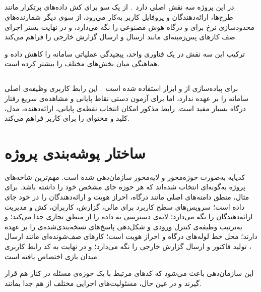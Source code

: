 \subsection{}

 در این پروژه سه نقش اصلی دارد~\cite{redis2024}. از یک سو برای
کش داده‌های پرتکرار مانند طرح‌ها، ارائه‌دهندگان و پروفایل کاربر به‌کار
می‌رود، از سوی دیگر شمارنده‌های محدودسازی نرخ برای  و درگاه هوش
مصنوعی را نگه می‌دارد، و در نهایت بستر اجرای صف کارهای پس‌زمینه‌ای مانند
ارسال  و ارسال گزارش خارجی را فراهم می‌کند.

ترکیب این سه نقش در یک فناوری واحد، پیچیدگی عملیاتی سامانه را کاهش داده
و هماهنگی میان بخش‌های مختلف را بیشتر کرده است.

\subsection{}

برای پیاده‌سازی  از  و ابزار
 استفاده شده است~\cite{vuejs2024}. این رابط کاربری وظیفه‌ی اصلی
سامانه را بر عهده ندارد، اما برای آزمون دستی نقاط پایانی و مشاهده‌ی سریع
رفتار درگاه بسیار مفید است. رابط مذکور امکان انتخاب نقطه‌ی پایانی،
ارائه‌دهنده، مدل، کلید  و محتوای  را برای کاربر فراهم می‌کند.

\section{ساختار پوشه‌بندی پروژه}

کدپایه به‌صورت حوزه‌محور و لایه‌محور سازمان‌دهی شده است. مهم‌ترین
شاخه‌های پروژه به‌گونه‌ای انتخاب شده‌اند که هر حوزه جای مشخص خود را داشته
باشد. برای مثال،  منطق دامنه‌های اصلی مانند درگاه، احراز
هویت و ارائه‌دهندگان را در خود جای داده است؛  سرویس‌های
سطح کاربرد برای مالی، گزارش، کاربران، کش و مدیریت ارائه‌دهندگان را
نگه می‌دارد؛  لایه‌ی دسترسی به داده را از منطق تجاری
جدا می‌کند؛  و  به‌ترتیب
وظیفه‌ی کنترل ورودی و شکل‌دهی پاسخ‌های نسخه‌بندی‌شده‌ی  را بر عهده
دارند؛  محل خط لوله‌های درگاه و احراز هویت است؛
 کارهای صف‌شونده‌ای مانند ارسال ، تولید 
فاکتور و ارسال گزارش خارجی را نگه می‌دارد؛ و در نهایت
 به کد رابط کاربری میدان بازی اختصاص یافته است.

این سازمان‌دهی باعث می‌شود که کدهای مرتبط با یک حوزه‌ی مسئله در کنار هم
قرار گیرند و در عین حال، مسئولیت‌های اجرایی مختلف از هم جدا بمانند.

